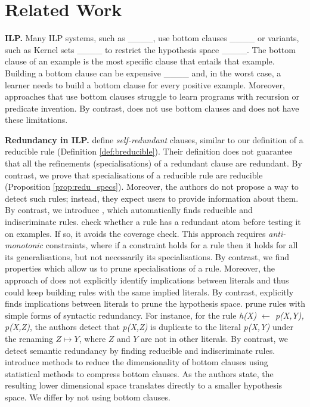 \section{Related Work}
\label{sec:related}

\textbf{ILP.}
Many ILP systems, such as \ale{} ____, use bottom clauses ____ or variants, such as Kernel sets ____ to restrict the hypothesis space ____. 
The bottom clause of an example is the most specific clause that entails that example.
Building a bottom clause can be expensive ____ and, in the worst case, a learner needs to build a bottom clause for every positive example.
Moreover, approaches that use bottom clauses struggle to learn programs with recursion or predicate invention.
By contrast, \name{} does not use bottom clauses and does not have these limitations.

\textbf{Redundancy in ILP.}
 define \emph{self-redundant} clauses, similar to our definition of a reducible rule (Definition \ref{def:breducible}).
Their definition does not guarantee that all the refinements (specialisations) of a redundant clause are redundant.
By contrast, we prove that specialisations of a reducible rule are reducible (Proposition \ref{prop:redu_specs}).
Moreover, the authors do not propose a way to detect such rules; instead, they expect users to provide information about them.
By contrast, we introduce \name{}, which automatically finds reducible and indiscriminate rules.
 check whether a rule has a redundant atom before testing it on examples.
If so, it avoids the coverage check.
This approach requires \textit{anti-monotonic} constraints, where if a constraint holds for a rule then it holds for all its generalisations, but not necessarily its specialisations.
By contrast, we find properties which allow us to prune specialisations of a rule.
Moreover, the approach of  does not explicitly identify implications between literals and thus could keep building rules with the same implied literals.
By contrast, \name{} explicitly finds implications between literals to prune the hypothesis space.
 prune rules with simple forms of syntactic redundancy.
For instance, for the rule \emph{h(X) $\leftarrow$ p(X,Y), p(X,Z)}, the authors detect that \emph{p(X,Z)} is duplicate to the literal \emph{p(X,Y)} under the renaming $Z \mapsto Y$, where $Z$ and $Y$ are not in other literals.
By contrast, we detect semantic redundancy by finding reducible and indiscriminate rules.
 introduce methods to reduce the dimensionality of bottom clauses using statistical methods to compress bottom clauses. 
As the authors state, the resulting lower dimensional space translates directly to a smaller hypothesis space. 
We differ by not using bottom clauses.


